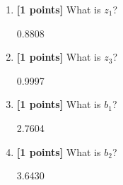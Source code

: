 \documentclass[11pt]{article}
\numberwithin{equation}{section} %
\numberwithin{figure}{section} %
\numberwithin{table}{section} %
\newcommand{\points}[1]{{\bf [#1 points]}}
\begin{document}
\begin{enumerate}
\begin{enumerate}
        \begin{tcolorbox}[fit,height=1cm, width=2cm, blank, borderline={1pt}{-2pt}]
            \begin{center}\huge7\end{center}
        \end{tcolorbox}
        
        
        
        \item \points{1} What is $z_1$?
        
        \begin{tcolorbox}[fit,height=1cm, width=2cm, blank, borderline={1pt}{-2pt}]
            \begin{center}\huge0.8808\end{center}
        \end{tcolorbox}
        
        
        \item \points{1} What is $z_3$?
        
        \begin{tcolorbox}[fit,height=1cm, width=2cm, blank, borderline={1pt}{-2pt}]
            \begin{center}\huge0.9997\end{center}
        \end{tcolorbox}
        
        
        
        \item \points{1} What is $b_1$?
        
        \begin{tcolorbox}[fit,height=1cm, width=2cm, blank, borderline={1pt}{-2pt}]
            \begin{center}\huge2.7604\end{center}
        \end{tcolorbox}
        
        
        \item \points{1} What is $b_2$?
        
        \begin{tcolorbox}[fit,height=1cm, width=2cm, blank, borderline={1pt}{-2pt}]
            \begin{center}\huge3.6430\end{center}
        \end{tcolorbox}
        
        
        

\end{enumerate}
\end{enumerate}
\end{document}
